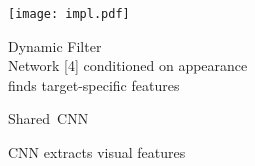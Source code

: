 \begin{minipage}{0.3\textwidth}
   \vspace{1em}
   \caption*{\Large {}:}
   \begin{minipage}[c]{0.5\textwidth}
       \centering
       \texttt{[image: impl.pdf]}
   \end{minipage}\hfill
    \begin{minipage}{0.6\textwidth}
     Dynamic Filter\\ Network [4] conditioned on appearance\\ finds target-specific features
    \end{minipage}
\vspace{.5em}
\end{minipage}
\begin{minipage}{0.3\textwidth}
    \centering
       \begin{minipage}[c]{0.26\textwidth}
         Shared~CNN
    \end{minipage}
    \begin{minipage}[c]{0.71\textwidth}
         CNN extracts visual features
    \end{minipage}
\end{minipage}

\vspace{\baselineskip}
